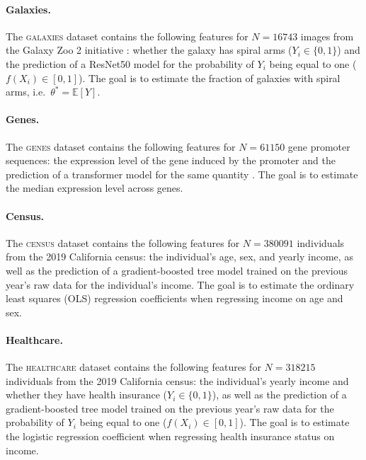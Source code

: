 \paragraph{Galaxies.}
The \textsc{galaxies} dataset contains the following features for $N = 16743$ images from the Galaxy Zoo 2 initiative \citep{Willett2013}: whether the galaxy has spiral arms ($Y_i \in \{0, 1\}$) and the prediction of a ResNet50 model \citep{He2016} for the probability of $Y_i$ being equal to one ($f(X_i) \in [0, 1]$). The goal is to estimate the fraction of galaxies with spiral arms, i.e.~$\theta^* = \mathbb{E}[Y]$.

\paragraph{Genes.}
The \textsc{genes} dataset contains the following features for $N = 61150$ gene promoter sequences: the expression level of the gene induced by the promoter and the prediction of a transformer model for the same quantity \citep{Vaishnav2022}. The goal is to estimate the median expression level across genes.

\paragraph{Census.}
The \textsc{census} dataset contains the following features for $N = 380091$ individuals from the 2019 California census: the individual's age, sex, and yearly income, as well as the prediction of a gradient-boosted tree model trained on the previous year's raw data for the individual's income. The goal is to estimate the ordinary least squares (OLS) regression coefficients when regressing income on age and sex.

\paragraph{Healthcare.}
The \textsc{healthcare} dataset contains the following features for $N = 318215$ individuals from the 2019 California census: the individual's yearly income and whether they have health insurance ($Y_i \in \{0, 1\}$), as well as the prediction of a gradient-boosted tree model trained on the previous year's raw data for the probability of $Y_i$ being equal to one ($f(X_i) \in [0, 1]$). The goal is to estimate the logistic regression coefficient when regressing health insurance status on income.

